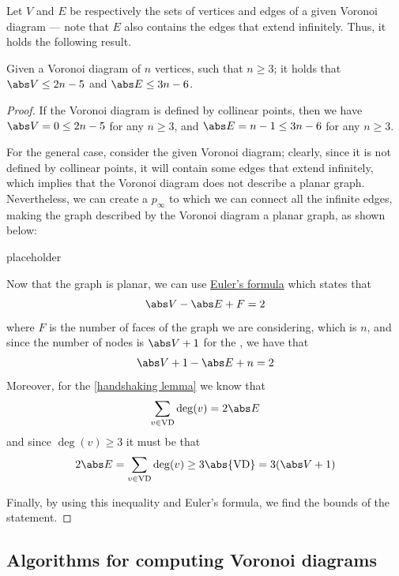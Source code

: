 \documentclass[a4paper, 12pt]{report}
\begin{document}
    Let $V$ and $E$ be respectively the sets of vertices and edges of a given Voronoi diagram --- note that $E$ also contains the edges that extend infinitely. Thus, it holds the following result.

    \begin{framedthm}{}
        Given a Voronoi diagram of $n$ vertices, such that $n \ge 3$; it holds that $\abs V \le 2n - 5$ and $\abs E \le 3n - 6$.
    \end{framedthm}

    \begin{proof}
        If the Voronoi diagram is defined by  collinear points, then we have $\abs V = 0 \le 2n - 5$ for any $n \ge 3$, and $\abs E = n - 1 \le 3n - 6$ for any $n \ge 3$.

        For the general case, consider the given Voronoi diagram; clearly, since it is not defined by  collinear points, it will contain some edges that extend infinitely, which implies that the Voronoi diagram does not describe a planar graph. Nevertheless, we can create a  $p_\infty$ to which we can connect all the infinite edges, making the graph described by the Voronoi diagram a planar graph, as shown below:

        placeholder 

        Now that the graph is planar, we can use \href{https://en.wikipedia.org/wiki/Planar_graph#Euler's_formula}{Euler's formula} which states that $$\abs V - \abs E + F = 2$$ where $F$ is the number of faces of the graph we are considering, which is $n$, and since the number of nodes is $\abs V + 1$ for the , we have that $$\abs V + 1 - \abs E + n =  2$$ Moreover, for the \cref{handshaking lemma} we know that $$\sum_{v \in \mathrm{VD}}{\deg(v)} = 2 \abs E$$ and since $\deg(v) \ge 3$ it must be that $$2 \abs E = \sum_{v \in \mathrm{VD}}{\deg(v)} \ge 3 \abs{\mathrm{VD}} = 3 (\abs V + 1)$$

        Finally, by using this inequality and Euler's formula, we find the bounds of the statement.
    \end{proof}


    \subsection{Algorithms for computing Voronoi diagrams}
\end{document}
